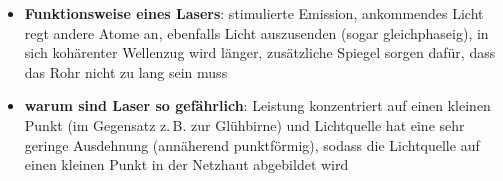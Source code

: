\linie
\begin{itemize}
    \item
    \textbf{Funktionsweise eines Lasers}:
    stimulierte Emission, ankommendes Licht regt andere Atome an,
    ebenfalls Licht auszusenden (sogar gleichphaseig),
    in sich kohärenter Wellenzug wird länger,
    zusätzliche Spiegel sorgen dafür, dass das Rohr nicht zu lang sein muss

    \item
    \textbf{warum sind Laser so gefährlich}:
    Leistung konzentriert auf einen kleinen Punkt (im Gegensatz z.\,B.
    zur Glühbirne) und
    Lichtquelle hat eine sehr geringe Ausdehnung (annäherend punktförmig),
    sodass die Lichtquelle auf einen kleinen Punkt in der Netzhaut abgebildet
    wird
\end{itemize}

\pagebreak
